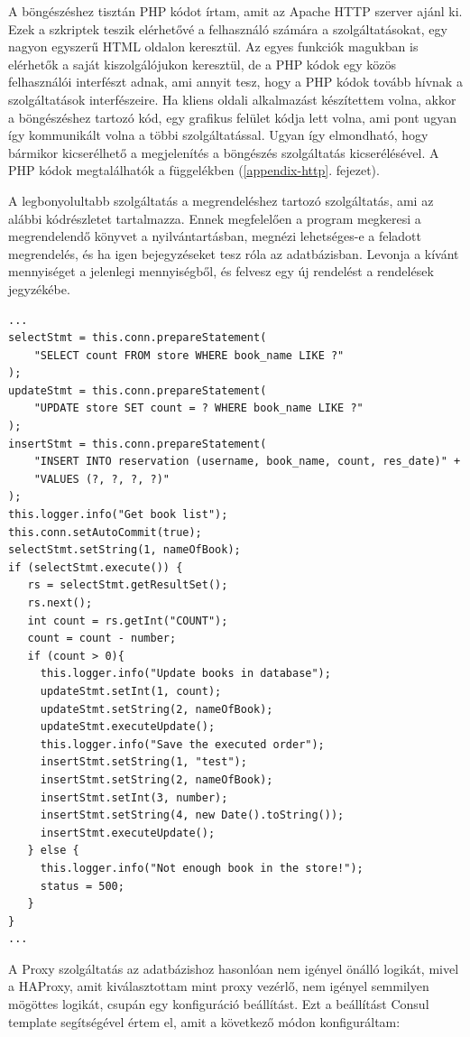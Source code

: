\documentclass[11pt,magyar,a4paper,twoside,]{report}
\begin{document}
A böngészéshez tisztán PHP kódot írtam, amit az Apache HTTP szerver
ajánl ki. Ezek a szkriptek teszik elérhetővé a felhasználó számára a
szolgáltatásokat, egy nagyon egyszerű HTML oldalon keresztül. Az egyes
funkciók magukban is elérhetők a saját kiszolgálójukon keresztül, de a
PHP kódok egy közös felhasználói interfészt adnak, ami annyit tesz, hogy
a PHP kódok tovább hívnak a szolgáltatások interfészeire. Ha kliens
oldali alkalmazást készítettem volna, akkor a böngészéshez tartozó kód,
egy grafikus felület kódja lett volna, ami pont ugyan így kommunikált
volna a többi szolgáltatással. Ugyan így elmondható, hogy bármikor
kicserélhető a megjelenítés a böngészés szolgáltatás kicserélésével. A
PHP kódok megtalálhatók a függelékben (\ref{appendix-http}. fejezet).

A legbonyolultabb szolgáltatás a megrendeléshez tartozó szolgáltatás,
ami az alábbi kódrészletet tartalmazza. Ennek megfelelően a program
megkeresi a megrendelendő könyvet a nyilvántartásban, megnézi
lehetséges-e a feladott megrendelés, és ha igen bejegyzéseket tesz róla
az adatbázisban. Levonja a kívánt mennyiséget a jelenlegi mennyiségből,
és felvesz egy új rendelést a rendelések jegyzékébe.

\begin{verbatim}
...
selectStmt = this.conn.prepareStatement(
    "SELECT count FROM store WHERE book_name LIKE ?"
);
updateStmt = this.conn.prepareStatement(
    "UPDATE store SET count = ? WHERE book_name LIKE ?"
);
insertStmt = this.conn.prepareStatement(
    "INSERT INTO reservation (username, book_name, count, res_date)" +
    "VALUES (?, ?, ?, ?)"
);
this.logger.info("Get book list");
this.conn.setAutoCommit(true);
selectStmt.setString(1, nameOfBook);
if (selectStmt.execute()) {
   rs = selectStmt.getResultSet();
   rs.next();
   int count = rs.getInt("COUNT");
   count = count - number;
   if (count > 0){
     this.logger.info("Update books in database");
     updateStmt.setInt(1, count);
     updateStmt.setString(2, nameOfBook);
     updateStmt.executeUpdate();
     this.logger.info("Save the executed order");
     insertStmt.setString(1, "test");
     insertStmt.setString(2, nameOfBook);
     insertStmt.setInt(3, number);
     insertStmt.setString(4, new Date().toString());
     insertStmt.executeUpdate();
   } else {
     this.logger.info("Not enough book in the store!");
     status = 500;     
   }
}
...
\end{verbatim}

A Proxy szolgáltatás az adatbázishoz hasonlóan nem igényel önálló
logikát, mivel a HAProxy, amit kiválasztottam mint proxy vezérlő, nem
igényel semmilyen mögöttes logikát, csupán egy konfiguráció beállítást.
Ezt a beállítást Consul template segítségével értem el, amit a következő
módon konfiguráltam:
\end{document}
